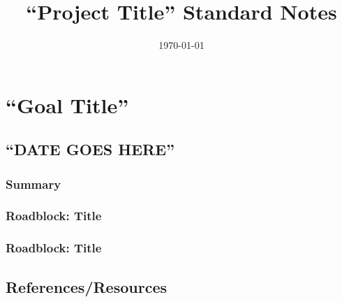 \documentclass[a4paper, 10pt]{article}
\title{``Project Title'' Standard Notes}
\date{\today}
\begin{document}
\maketitle

\pagebreak

\tableofcontents

\pagebreak


\section*{``Goal Title''}


	\subsection*{``DATE GOES HERE''}
		\subsubsection*{Summary}
	
		\subsubsection{Roadblock: Title}

		\subsubsection{Roadblock: Title}

	\subsection*{References/Resources}
\end{document}
